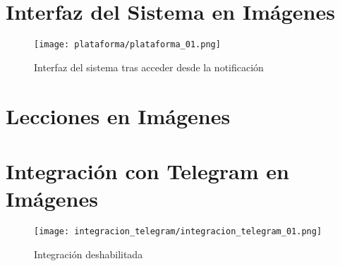 

\appendices
\section{Interfaz del Sistema en Imágenes}

\begin{figure}[H]
    \centering
    \texttt{[image: plataforma/plataforma\_01.png]}
    \caption{Interfaz del sistema tras acceder desde la notificación}
    \label{fig:interfaz_sistema_notifiacion}
\end{figure}

\section{Lecciones en Imágenes}

\section{Integración con Telegram en Imágenes}

\begin{figure}[H]
    \centering
    \texttt{[image: integracion\_telegram/integracion\_telegram\_01.png]}
    \caption{Integración deshabilitada}
    \label{fig:integracion_telegram_deshabilitada}
\end{figure}

